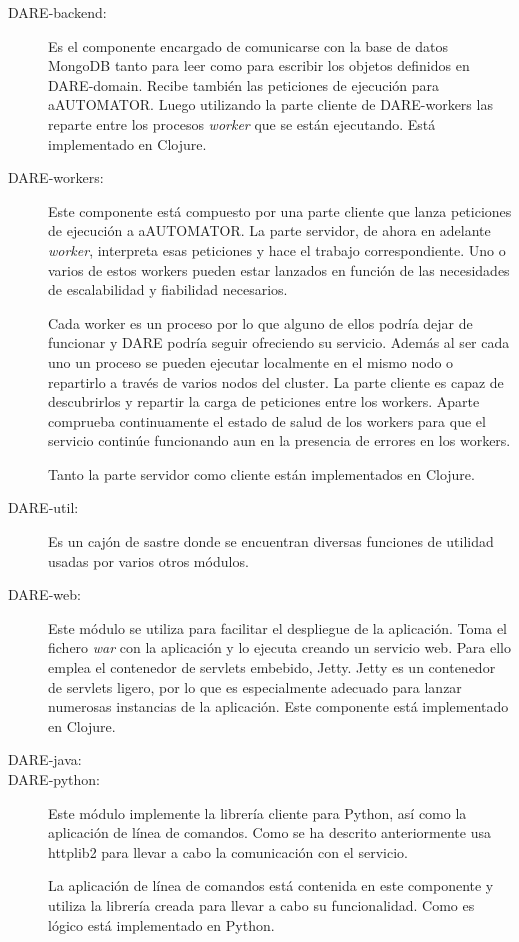\begin{description}
\item[DARE-backend:] Es el componente encargado de comunicarse con la
  base de datos MongoDB tanto para leer como para escribir los objetos
  definidos en DARE-domain. Recibe también las peticiones de ejecución
  para aAUTOMATOR. Luego utilizando la parte cliente de DARE-workers
  las reparte entre los procesos \emph{worker} que se están
  ejecutando. Está implementado en Clojure.

\item[DARE-workers:] Este componente está compuesto por una parte
  cliente que lanza peticiones de ejecución a aAUTOMATOR. La parte
  servidor, de ahora en adelante \emph{worker}, interpreta esas
  peticiones y hace el trabajo correspondiente. Uno o varios de estos
  workers pueden estar lanzados en función de las necesidades de
  escalabilidad y fiabilidad necesarios.

  Cada worker es un proceso por lo que alguno de ellos podría dejar de
  funcionar y DARE podría seguir ofreciendo su servicio. Además al ser
  cada uno un proceso se pueden ejecutar localmente en el mismo nodo o
  repartirlo a través de varios nodos del cluster. La parte cliente es
  capaz de descubrirlos y repartir la carga de peticiones entre los
  workers. Aparte comprueba continuamente el estado de salud de los
  workers para que el servicio continúe funcionando aun en la
  presencia de errores en los workers.

 Tanto la parte servidor como cliente están implementados en Clojure.

\item[DARE-util:] Es un cajón de sastre donde se encuentran diversas
  funciones de utilidad usadas por varios otros módulos.

\item[DARE-web:] Este módulo se utiliza para facilitar el despliegue
  de la aplicación. Toma el fichero \emph{war} con la aplicación y lo
  ejecuta creando un servicio web. Para ello emplea el contenedor de
  servlets embebido, Jetty\cite{JETTY}. Jetty es un contenedor de
  servlets ligero, por lo que es especialmente adecuado para lanzar
  numerosas instancias de la aplicación. Este componente está
  implementado en Clojure.

\item[DARE-java:] %
\item[DARE-python:] Este módulo implemente la librería cliente para
  Python, así como la aplicación de línea de comandos. Como se ha
  descrito anteriormente usa httplib2 para llevar a cabo la
  comunicación con el servicio.

  La aplicación de línea de comandos está contenida en este componente
  y utiliza la librería creada para llevar a cabo su
  funcionalidad. Como es lógico está implementado en Python.
\end{description}

